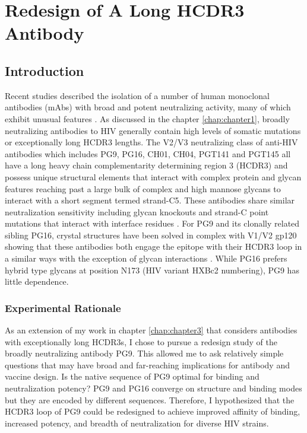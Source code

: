 \chapter{Redesign of A Long HCDR3 Antibody}
\label{chap:chapter4}
\section{Introduction}
Recent studies described the isolation of a number of human monoclonal antibodies (mAbs) with broad and potent neutralizing activity, many of which exhibit unusual features \citep{Bonsignori:2011dq,McLellan:2011dg,Walker:2009cd,Walker:2011ew}. As discussed in the chapter \ref{chap:chapter1}, broadly neutralizing antibodies to HIV generally contain high levels of somatic mutations or exceptionally long HCDR3 lengths. The V2/V3 neutralizing class of anti-HIV antibodies which includes PG9, PG16, CH01, CH04, PGT141 and PGT145 all have a long heavy chain complementarity determining region 3 (HCDR3) and possess unique structural elements that interact with complex protein and glycan features reaching past a large bulk of complex and high mannose glycans to interact with a short segment termed strand-C5. These antibodies share similar neutralization sensitivity including glycan knockouts and strand-C point mutations that interact with interface residues \citep{DoriaRose:2012if,Doores:2010gn}.  For PG9 and its clonally related sibling PG16, crystal structures have been solved in complex with V1/V2 gp120 showing that these antibodies both engage the epitope with their HCDR3 loop in a similar ways with the exception of glycan interactions \citep{Pancera:2013ev}. While PG16 prefers hybrid type glycans at position N173 (HIV variant HXBc2 numbering), PG9 has little dependence.

\subsection{Experimental Rationale}
As an extension of my work in chapter \ref{chap:chapter3} that considers antibodies with exceptionally long HCDR3s, I chose to pursue a redesign study of the broadly neutralizing antibody PG9. This allowed me to ask relatively simple questions that may have broad and far-reaching implications for antibody and vaccine design. Is the native sequence of PG9 optimal for binding and neutralization potency? PG9 and PG16 converge on structure and binding modes but they are encoded by different sequences. Therefore, I hypothesized that the HCDR3 loop of PG9 could be redesigned to achieve improved affinity of binding, increased potency, and breadth of neutralization for diverse HIV strains.


